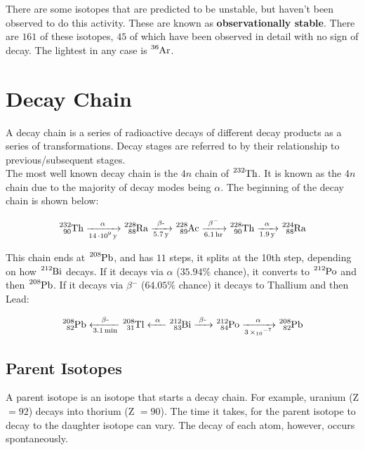\documentclass{article}
\begin{document}
\begin{multicols*}{2}
    There are some isotopes that are predicted to be unstable, but haven't been observed
    to do this activity. These are known as \textbf{observationally stable}. There are
    $161$ of these isotopes, $45$ of which have been observed in detail with no sign of
    decay. The lightest in any case is $\ce{^{36}Ar}$.

    \section{Decay Chain}
    A decay chain is a series of radioactive decays of different decay products
    as a series of transformations. Decay stages are referred to by their relationship
    to previous/subsequent stages.\\

    The most well known decay chain is the $4n$ chain of $\ce{^{232}Th}$. It is known
    as the $4n$ chain due to the majority of decay modes being $\alpha$. The beginning
    of the decay chain is shown below:

    \begin{equation*}
      \begin{split}
        \ce{^{232}_{90}Th ->[\alpha][14\cdot{10^{9}} y] ^{228}_{88}Ra
          ->[\beta{-}][5.7 y] ^{228}_{89}Ac ->[\beta-][6.1 hr] ^{228}_{90}Th
          ->[\alpha][1.9 y] ^{224}_{88}Ra}
      \end{split}
    \end{equation*}

    This chain ends at $\ce{^{208}Pb}$, and has $11$ steps, it splits at the
    10th step, depending
    on how $\ce{^{212}Bi}$ decays. If it decays via $\alpha$ ($35.94\%$ chance),
    it converts to $\ce{^{212}Po}$ and then $\ce{^{208}Pb}$. If it decays via
    $\beta{^{-}}$ ($64.05\%$ chance) it decays to Thallium and then Lead:

    \begin{equation*}
      \begin{split}
        \ce{^{208}_{82}Pb <-[\beta{-}][3.1 min] ^{208}_{31}Tl <-[\alpha] ^{212}_{83}Bi
            ->[\beta{-}] ^{212}_{84}Po ->[\alpha][3 \times 10^{-7}]
            ^{208}_{82}Pb}
      \end{split}
    \end{equation*}

    \subsection{Parent Isotopes}
    A parent isotope is an isotope that starts a decay chain. For example, uranium
    (Z $=92$) decays into thorium (Z $=90$). The time it takes, for the parent isotope
    to decay to the daughter isotope can vary. The decay of each atom, however, occurs
    spontaneously.


\end{multicols*}
\end{document}
